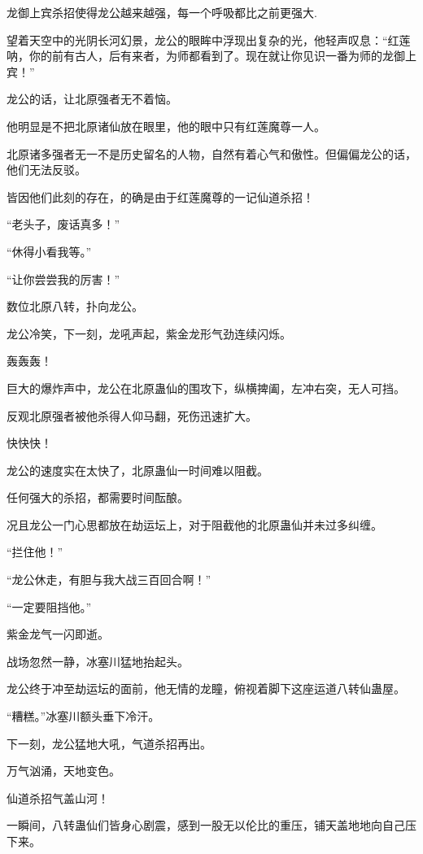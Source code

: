 
\begin{this_body}

龙御上宾杀招使得龙公越来越强，每一个呼吸都比之前更强大.

望着天空中的光阴长河幻景，龙公的眼眸中浮现出复杂的光，他轻声叹息：“红莲呐，你的前有古人，后有来者，为师都看到了。现在就让你见识一番为师的龙御上宾！”

龙公的话，让北原强者无不着恼。

他明显是不把北原诸仙放在眼里，他的眼中只有红莲魔尊一人。

北原诸多强者无一不是历史留名的人物，自然有着心气和傲性。但偏偏龙公的话，他们无法反驳。

皆因他们此刻的存在，的确是由于红莲魔尊的一记仙道杀招！

“老头子，废话真多！”

“休得小看我等。”

“让你尝尝我的厉害！”

数位北原八转，扑向龙公。

龙公冷笑，下一刻，龙吼声起，紫金龙形气劲连续闪烁。

轰轰轰！

巨大的爆炸声中，龙公在北原蛊仙的围攻下，纵横捭阖，左冲右突，无人可挡。

反观北原强者被他杀得人仰马翻，死伤迅速扩大。

快快快！

龙公的速度实在太快了，北原蛊仙一时间难以阻截。

任何强大的杀招，都需要时间酝酿。

况且龙公一门心思都放在劫运坛上，对于阻截他的北原蛊仙并未过多纠缠。

“拦住他！”

“龙公休走，有胆与我大战三百回合啊！”

“一定要阻挡他。”

紫金龙气一闪即逝。

战场忽然一静，冰塞川猛地抬起头。

龙公终于冲至劫运坛的面前，他无情的龙瞳，俯视着脚下这座运道八转仙蛊屋。

“糟糕。”冰塞川额头垂下冷汗。

下一刻，龙公猛地大吼，气道杀招再出。

万气汹涌，天地变色。

仙道杀招气盖山河！

一瞬间，八转蛊仙们皆身心剧震，感到一股无以伦比的重压，铺天盖地地向自己压下来。


\end{this_body}
